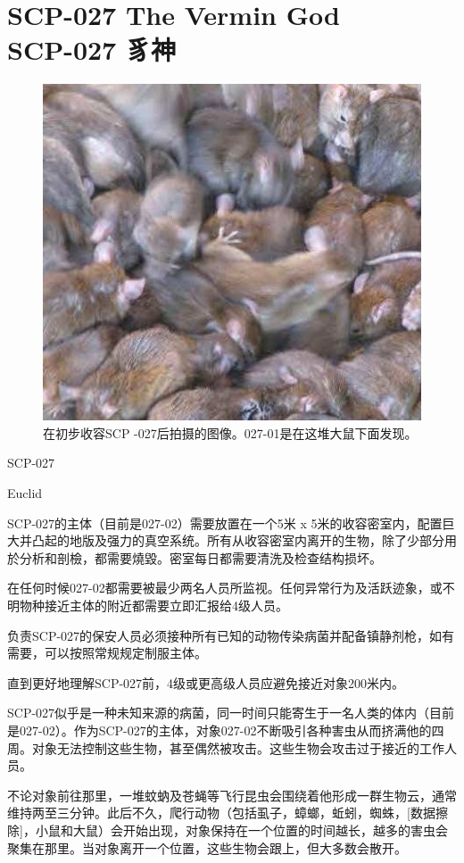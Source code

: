\chapter[SCP-027 豸神]{
    SCP-027 The Vermin God\\
    SCP-027 豸神
}

\label{chap:SCP-027}

\begin{figure}[H]
    \centering
    \includegraphics[width=0.5\linewidth]{images/SCP-027.jpg}
    \caption*{在初步收容SCP -027后拍摄的图像。027-01是在这堆大鼠下面发现。}
\end{figure}

SCP-027

Euclid

SCP-027的主体（目前是027-02）需要放置在一个5米 x 5米的收容密室内，配置巨大并凸起的地版及强力的真空系统。所有从收容密室内离开的生物，除了少部分用於分析和剖檢，都需要燒毀。密室每日都需要清洗及检查结构损坏。

在任何时候027-02都需要被最少两名人员所监视。任何异常行为及活跃迹象，或不明物种接近主体的附近都需要立即汇报给4级人员。

负责SCP-027的保安人员必须接种所有已知的动物传染病菌并配备镇静剂枪，如有需要，可以按照常规规定制服主体。

直到更好地理解SCP-027前，4级或更高级人员应避免接近对象200米内。

SCP-027似乎是一种未知来源的病菌，同一时间只能寄生于一名人类的体内（目前是027-02）。作为SCP-027的主体，对象027-02不断吸引各种害虫从而挤满他的四周。对象无法控制这些生物，甚至偶然被攻击。这些生物会攻击过于接近的工作人员。

不论对象前往那里，一堆蚊蚋及苍蝇等飞行昆虫会围绕着他形成一群生物云，通常维持两至三分钟。此后不久，爬行动物（包括虱子，蟑螂，蚯蚓，蜘蛛，[数据擦除]，小鼠和大鼠）会开始出现，对象保持在一个位置的时间越长，越多的害虫会聚集在那里。当对象离开一个位置，这些生物会跟上，但大多数会散开。

